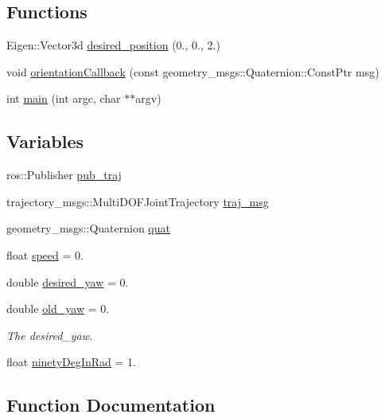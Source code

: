 \subsection*{Functions}
\begin{DoxyCompactItemize}
\item 
Eigen\+::\+Vector3d \hyperlink{oculus-control-alternative_8cpp_a33ebb53f44ddfc738d5914aed4017e53}{desired\+\_\+position} (0., 0., 2.)
\item 
void \hyperlink{oculus-control-alternative_8cpp_a570d60ef77ebe021853fd13c864ab969}{orientation\+Callback} (const geometry\+\_\+msgs\+::\+Quaternion\+::\+Const\+Ptr msg)
\item 
int \hyperlink{oculus-control-alternative_8cpp_a3c04138a5bfe5d72780bb7e82a18e627}{main} (int argc, char $\ast$$\ast$argv)
\end{DoxyCompactItemize}
\subsection*{Variables}
\begin{DoxyCompactItemize}
\item 
ros\+::\+Publisher \hyperlink{oculus-control-alternative_8cpp_a92b67ae724bc0d23b8e85e92e89403df}{pub\+\_\+traj}
\item 
trajectory\+\_\+msgs\+::\+Multi\+D\+O\+F\+Joint\+Trajectory \hyperlink{oculus-control-alternative_8cpp_a090c0766fbb77862dd8cc0cca99d688b}{traj\+\_\+msg}
\item 
geometry\+\_\+msgs\+::\+Quaternion \hyperlink{oculus-control-alternative_8cpp_a71181c8a89676b15be113f74f57c9f23}{quat}
\item 
float \hyperlink{oculus-control-alternative_8cpp_a7f7e4724cf57d59513b39c5ecc81adc8}{speed} = 0.
\item 
double \hyperlink{oculus-control-alternative_8cpp_a03a69ef33d756512293e67791ab5f265}{desired\+\_\+yaw} = 0.
\item 
double \hyperlink{oculus-control-alternative_8cpp_a6f2a069eeaa873686f0991fe351fec51}{old\+\_\+yaw} = 0.
\begin{DoxyCompactList}\small\item\em The desired\+\_\+yaw. \end{DoxyCompactList}\item 
float \hyperlink{oculus-control-alternative_8cpp_a2cce9b626fdb3b1f78baad955bd5b609}{ninety\+Deg\+In\+Rad} = 1.
\end{DoxyCompactItemize}


\subsection{Function Documentation}
